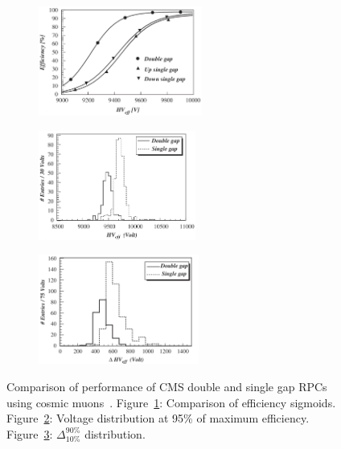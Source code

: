 	\begin{figure}[H]
		\begin{subfigure}{0.33\linewidth}
			\centering
			\hspace*{-0.3\linewidth}
			\includegraphics[height = 3.6cm]{fig/chapt4/Double-gap-Sigmoid.png}
			\caption{\label{fig:DoubleGap:A}}
		\end{subfigure}
		\begin{subfigure}{0.33\linewidth}
			\centering
			\hspace*{-0.1\linewidth}
			\includegraphics[height = 3.6cm]{fig/chapt4/Double-gap-Eff-95.png}
			\caption{\label{fig:DoubleGap:B}}
		\end{subfigure}
		\begin{subfigure}{0.33\linewidth}
			\centering
			\hspace*{0.03\linewidth}
			\includegraphics[height = 3.6cm]{fig/chapt4/Double-gap-Eff-Delta-90-10.png}
			\caption{\label{fig:DoubleGap:C}}
		\end{subfigure}
		\caption{\label{fig:DoubleGap} Comparison of performance of CMS double and single gap RPCs using cosmic muons~\cite{ABBRESCIA2005}. Figure~\ref{fig:DoubleGap:A}: Comparison of efficiency sigmoids. Figure~\ref{fig:DoubleGap:B}: Voltage distribution at 95\% of maximum efficiency. Figure~\ref{fig:DoubleGap:C}: $\Delta^{90\%}_{10\%}$ distribution.}
	\end{figure}
	
